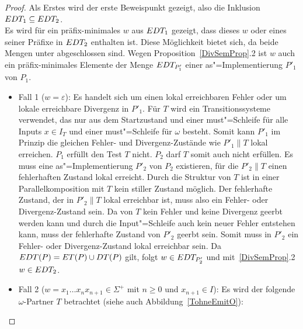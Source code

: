 \begin{proof}
  Als Erstes wird der erste Beweispunkt gezeigt, also die Inklusion $EDT
  _1\subseteq EDT _2$.\\
  Es wird für ein präfix-minimales $w$ aus $EDT _1$ gezeigt, dass dieses $w$
  oder eines seiner Präfixe in $EDT _2$ enthalten ist. Diese Möglichkeit
  bietet sich, da beide Mengen unter \cont{} abgeschlossen sind. Wegen
  Proposition~\ref{DivSemProp}.2 ist $w$ auch ein präfix-minimales Elemente
  der Menge $EDT _{P'_1}$ einer as"=Implementierung $P'_1$ von $P_1$.
  \begin{itemize}
    \item Fall 1 ($w=\varepsilon$): Es handelt sich um einen lokal erreichbaren
      Fehler oder um lokale erreichbare Divergenz in $P'_1$. Für $T$ wird ein
      Transitionssysteme verwendet, das nur aus dem Startzustand und einer
      must"=Schleife für alle Inputs $x\in I_T$ und einer must"=Schleife für
      $\omega$ besteht. Somit kann $P'_1$ im Prinzip die gleichen Fehler- und
      Divergenz-Zustände wie $P'_1\|T$ lokal erreichen. $P_1$ erfüllt den Test
      $T$ nicht. $P_2$ darf $T$ somit auch nicht erfüllen. Es muss eine
      as"=Implementierung $P'_2$ von $P_2$ existieren, für die $P'_2\|T$ einen
      fehlerhaften Zustand lokal erreicht. Durch die Struktur von $T$ ist in
      einer Parallelkomposition mit $T$ kein stiller Zustand möglich. Der
      fehlerhafte Zustand, der in $P'_2\|T$ lokal erreichbar ist, muss also ein
      Fehler- oder Divergenz-Zustand sein. Da von $T$ kein Fehler und keine
      Divergenz geerbt werden kann und durch die Input"=Schleife auch kein
      neuer Fehler entstehen kann, muss der fehlerhafte Zustand von $P'_2$
      geerbt sein. Somit muss in $P'_2$ ein Fehler- oder Divergenz-Zustand
      lokal erreichbar sein. Da $EDT (P) =ET (P)\cup DT (P)$ gilt, folgt
      $w\in EDT _{P'_2}$ und mit~\ref{DivSemProp}.2 $w\in EDT _2$.
    \item Fall 2 ($w=x_1\dots x_n x_{n+1}\in\Sigma ^+$ mit $n\geq 0$ und
      $x_{n+1}\in I$): Es wird der folgende $\omega$-Partner $T$ betrachtet
      (siehe auch Abbildung~\ref{TohneEmitO}):
\end{itemize}
\end{proof}
